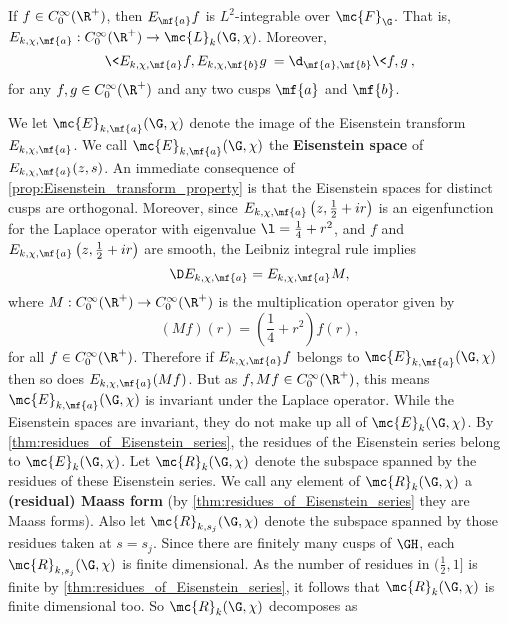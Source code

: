    \begin{proposition}\label{prop:Eisenstein_transform_property}
      If $f \in C_{0}^{\infty}(\R^{+})$, then $E_{\mf{a}}f$ is $L^{2}$-integrable over $\mc{F}_{\G}$. That is, $E_{k,\chi,\mf{a}}:C_{0}^{\infty}(\R^{+}) \to \mc{L}_{k}(\G,\chi)$. Moreover,
      \[
        \<E_{k,\chi,\mf{a}}f,E_{k,\chi,\mf{b}}g\> = \d_{\mf{a},\mf{b}}\<f,g\>,
      \]
      for any $f,g \in C_{0}^{\infty}(\R^{+})$ and any two cusps $\mf{a}$ and $\mf{b}$.
    \end{proposition}

    We let $\mc{E}_{k,\mf{a}}(\G,\chi)$ denote the image of the Eisenstein transform $E_{k,\chi,\mf{a}}$. We call $\mc{E}_{k,\mf{a}}(\G,\chi)$ the \textbf{Eisenstein space} of $E_{k,\chi,\mf{a}}(z,s)$. An immediate consequence of \cref{prop:Eisenstein_transform_property} is that the Eisenstein spaces for distinct cusps are orthogonal. Moreover, since $E_{k,\chi,\mf{a}}\left(z,\frac{1}{2}+ir\right)$ is an eigenfunction for the Laplace operator with eigenvalue $\l = \frac{1}{4}+r^{2}$, and $f$ and $E_{k,\chi,\mf{a}}\left(z,\frac{1}{2}+ir\right)$ are smooth, the Leibniz integral rule implies
    \[
      \D E_{k,\chi,\mf{a}}= E_{k,\chi,\mf{a}}M,
    \]
    where $M:C_{0}^{\infty}(\R^{+}) \to C_{0}^{\infty}(\R^{+})$ is the multiplication operator given by
    \[
      (Mf)(r) = \left(\frac{1}{4}+r^{2}\right)f(r),
    \]
    for all $f \in C_{0}^{\infty}(\R^{+})$. Therefore if $E_{k,\chi,\mf{a}}f$ belongs to $\mc{E}_{k,\mf{a}}(\G,\chi)$ then so does $E_{k,\chi,\mf{a}}(Mf)$. But as $f,Mf \in C_{0}^{\infty}(\R^{+})$, this means $\mc{E}_{k,\mf{a}}(\G,\chi)$ is invariant under the Laplace operator. While the Eisenstein spaces are invariant, they do not make up all of $\mc{E}_{k}(\G,\chi)$. By \cref{thm:residues_of_Eisenstein_series}, the residues of the Eisenstein series belong to $\mc{E}_{k}(\G,\chi)$. Let $\mc{R}_{k}(\G,\chi)$ denote the subspace spanned by the residues of these Eisenstein series. We call any element of $\mc{R}_{k}(\G,\chi)$ a \textbf{(residual) Maass form} (by \cref{thm:residues_of_Eisenstein_series} they are Maass forms). Also let $\mc{R}_{k,s_{j}}(\G,\chi)$ denote the subspace spanned by those residues taken at $s = s_{j}$. Since there are finitely many cusps of $\GH$, each $\mc{R}_{k,s_{j}}(\G,\chi)$ is finite dimensional. As the number of residues in $(\frac{1}{2},1]$ is finite by \cref{thm:residues_of_Eisenstein_series}, it follows that $\mc{R}_{k}(\G,\chi)$ is finite dimensional too. So $\mc{R}_{k}(\G,\chi)$ decomposes as
